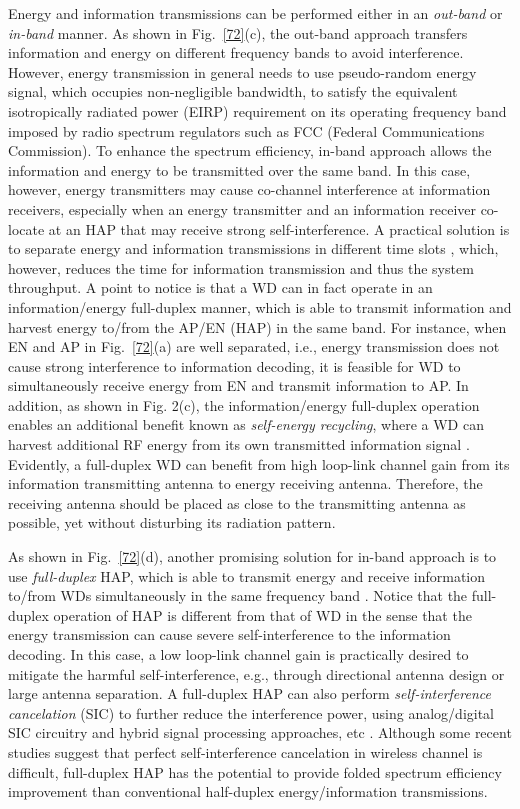 \documentclass[journal, draftcls, one column, 12pt]{IEEEtran}
\begin{document}
Energy and information transmissions can be performed either in an \emph{out-band} or \emph{in-band} manner. As shown in Fig.~\ref{72}(c), the out-band approach transfers information and energy on different frequency bands to avoid interference. However, energy transmission in general needs to use pseudo-random energy signal, which occupies non-negligible bandwidth, to satisfy the equivalent isotropically radiated power (EIRP) requirement on its operating frequency band imposed by radio spectrum regulators such as FCC (Federal Communications Commission). To enhance the spectrum efficiency, in-band approach allows the information and energy to be transmitted over the same band. In this case, however, energy transmitters may cause co-channel interference at information receivers, especially when an energy transmitter and an information receiver co-locate at an HAP that may receive strong self-interference. A practical  solution is to separate energy and information transmissions in different time slots \cite{2014:Ju}, which, however, reduces the time for information transmission and thus the system throughput. A point to notice is that a WD can in fact operate in an information/energy full-duplex manner, which is able to transmit information and harvest energy to/from the AP/EN (HAP) in the same band. For instance, when EN and AP in Fig.~\ref{72}(a) are well separated, i.e., energy transmission does not cause strong interference to information decoding, it is feasible for WD to simultaneously receive energy from EN and transmit information to AP. In addition, as shown in Fig. 2(c), the information/energy full-duplex operation enables an additional benefit known as \emph{self-energy recycling}, where a WD can harvest additional RF energy from its own transmitted information signal \cite{2015:Zeng1}. Evidently, a full-duplex WD can benefit from high loop-link channel gain from its information transmitting antenna to energy receiving antenna. Therefore, the receiving antenna should be placed as close to the transmitting antenna as possible, yet without disturbing its radiation pattern.

As shown in Fig.~\ref{72}(d), another promising solution for in-band approach is to use \emph{full-duplex} HAP, which is able to transmit energy and receive information to/from WDs simultaneously in the same frequency band \cite{2014:Ju1}. Notice that the full-duplex operation of HAP is different from that of WD in the sense that the energy transmission can cause severe self-interference to the information decoding. In this case, a low loop-link channel gain is practically desired to mitigate the harmful self-interference, e.g., through directional antenna design or large antenna separation. A full-duplex HAP can also perform \emph{self-interference cancelation} (SIC) to further reduce the interference power, using analog/digital SIC circuitry and hybrid signal processing approaches, etc \cite{2014:Sabharwal}. Although some recent studies suggest that perfect self-interference cancelation in wireless channel is difficult, full-duplex HAP has the potential to provide folded spectrum efficiency improvement than conventional half-duplex energy/information transmissions.
\end{document}
